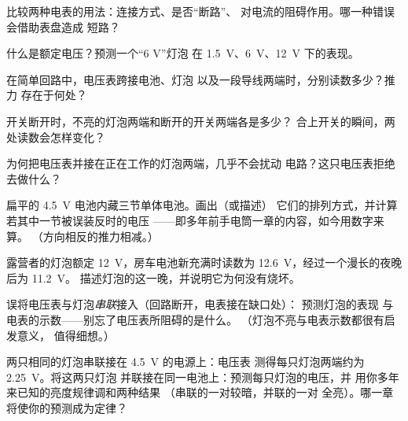 \begin{exercise}[$\star$]\label{exo:g8:voltage-voltmeter:4}
比较两种电表的用法：连接方式、是否“断路”、
对电流的阻碍作用。哪一种错误会借助表盘造成
短路？
\end{exercise}

\begin{exercise}[$\star$]\label{exo:g8:voltage-voltmeter:5}
什么是额定电压？预测一个“6 V”灯泡
在 \qty{1.5}{V}、\qty{6}{V}、\qty{12}{V} 下的表现。
\end{exercise}

\begin{exercise}[$\star$]\label{exo:g8:voltage-voltmeter:6}
在简单回路中，电压表跨接电池、灯泡
以及一段导线两端时，分别读数多少？推力
存在于何处？
\end{exercise}

\begin{exercise}[$\star$]\label{exo:g8:voltage-voltmeter:7}
开关断开时，不亮的灯泡两端和断开的开关两端各是多少？
合上开关的瞬间，两处读数会怎样变化？
\end{exercise}

\begin{exercise}[$\star$]\label{exo:g8:voltage-voltmeter:8}
为何把电压表并接在正在工作的灯泡两端，几乎不会扰动
电路？这只电压表拒绝
去做什么？
\end{exercise}

\begin{exercise}[$\star\star$]\label{exo:g8:voltage-voltmeter:9}
扁平的 \qty{4.5}{V} 电池内藏三节单体电池。画出（或描述）
它们的排列方式，并计算若其中一节被误装反时的电压
——即多年前手电筒一章的内容，如今用数字来算。
（方向相反的推力相减。）
\end{exercise}

\begin{exercise}[$\star\star$]\label{exo:g8:voltage-voltmeter:10}
露营者的灯泡额定 \qty{12}{V}，房车电池新充满时读数为
\qty{12.6}{V}，经过一个漫长的夜晚后为 \qty{11.2}{V}。
描述灯泡的这一晚，并说明它为何没有烧坏。
\end{exercise}

\begin{exercise}[$\star\star$]\label{exo:g8:voltage-voltmeter:11}
误将电压表与灯泡\emph{串联}接入（回路断开，电表接在缺口处）：
预测灯泡的表现
与电表的示数——别忘了电压表所阻碍的是什么。
（灯泡不亮与电表示数都很有启发意义，
值得细想。）
\end{exercise}

\begin{exercise}[$\star\star\star$]\label{exo:g8:voltage-voltmeter:12}
两只相同的灯泡串联接在 \qty{4.5}{V} 的电源上：电压表
测得每只灯泡两端约为 \qty{2.25}{V}。将这两只灯泡
并联接在同一电池上：预测每只灯泡的电压，并
用你多年来已知的亮度规律调和两种结果
（串联的一对较暗，并联的一对
全亮）。哪一章将使你的预测成为定律？
\end{exercise}

